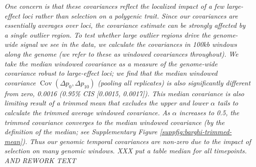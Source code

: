 \documentclass[11pt]{article}
\newcommand{\gc}[1]{{\it \color{red} #1 } }
\newcommand{\vb}[1]{{\it \color{blue} #1}}
\DeclareMathOperator{\cov}{Cov}
\begin{document}
\gc{One concern is that these covariances reflect the localized impact
  of a few large-effect loci
  rather than selection on a polygenic trait. Since our covariances are
  essentially averages over loci, the covariance estimate can be strongly
  affected by a single outlier region. To test whether large outlier regions
  drive the genome-wide signal we see in the \textcite{Barghi2019-qy} data, we
  calculate the covariances in 100kb windows along the genome (we refer to
  these as windowed covariances throughout). We take the median
  windowed covariance as a measure of the genome-wide covariance robust to
  large-effect loci; we find that the median windowed covariance $\cov(\Delta
  p_0, \Delta p_{10})$ (pooling all replicates) is also significantly different
  from zero, 0.0016 (0.95\% CIS [0.0015, 0.0017]). This median
  covariance is also limiting result of a trimmed mean that excludes the upper and lower
  $\alpha$ tails to calculate the trimmed average windowed covariance. As
  $\alpha$ increases to 0.5, the trimmed covariance converges to the median
  windowed covariance (by the definition of the median; see Supplementary
  Figure \ref{suppfig:barghi-trimmed-mean}). Thus our genomic temporal
  covariances are non-zero due to the impact of selection on many
  genomic windows.
  XXX put a table median for all timepoints. AND REWORK TEXT
 }

  

\end{document}
